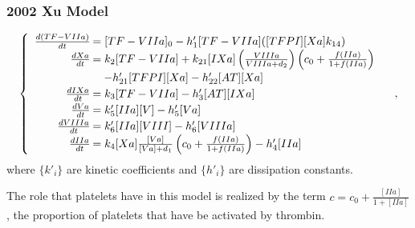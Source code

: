 \begin{frame}
\frametitle{2002 Xu Model \cite{Xu}}\vspace{-1.5em}
$$\begin{cases}\begin{array}{rl}
\frac{d(TF-VIIa)}{dt}\hspace{-.8em}&=[TF-VIIa]_0-h'_1[TF-VIIa]([TFPI][Xa]k_{14})\\
\frac{dXa}{dt}\hspace{-.8em}&=k_2[TF-VIIa]+k_{21}[IXa]\left(\frac{VIIIa}{VIIIa+d_2}\right)\left(c_0+\frac{f(IIa)}{1+f(IIa)}\right)\\&\hspace{1em}-h'_{21}[TFPI][Xa]-h'_{22}[AT][Xa]\\
\frac{dIXa}{dt}\hspace{-.8em}&=k_3[TF-VIIa]-h'_3[AT][IXa]\\
\frac{dVa}{dt}\hspace{-.8em}&=k'_5[IIa][V]-h'_5[Va]\\
\frac{dVIIIa}{dt}\hspace{-.8em}&=k'_6[IIa][VIII]-h'_6[VIIIa]\\
\frac{dIIa}{dt}\hspace{-.8em}&=k_4[Xa]\frac{[Va]}{[Va]+d_1}\left(c_0+\frac{f(IIa)}{1+f(IIa)}\right)-h'_4[IIa]
\end{array}\end{cases},$$ where $\{k'_i\}$ are kinetic coefficients and $\{h'_i\}$ are dissipation constants.

\hspace{1.57em}The role that platelets have in this model is realized by the term $c=c_0+\frac{[IIa]}{1+[IIa]}$, the proportion of platelets that have be activated by thrombin.%
\end{frame}
